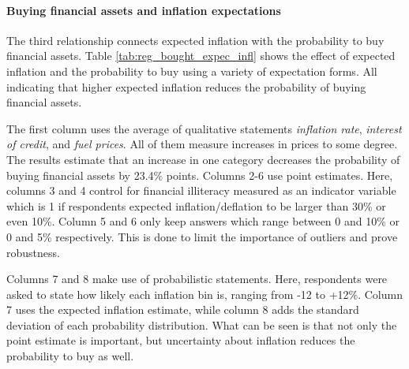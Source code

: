 \documentclass[ProjectABM]{subfiles}
\begin{document}



\paragraph{Buying financial assets and inflation expectations}
The third relationship connects expected inflation with the probability to buy financial assets. %
Table \ref{tab:reg_bought_expec_infl} shows the effect of expected inflation and the probability to buy using a variety of expectation forms. All indicating that higher expected inflation reduces the probability of buying financial assets.

The first column uses the average of qualitative statements \textit{inflation rate}, \textit{interest of credit}, and \textit{fuel prices}. All of them measure increases in prices to some degree. The results estimate that an increase in one category decreases the probability of buying financial assets by 23.4\% points. Columns 2-6 use point estimates. Here, columns 3 and 4 control for financial illiteracy measured as an indicator variable which is 1 if respondents expected inflation/deflation to be larger than 30\% or even 10\%. Column 5 and 6 only keep answers which range between 0 and 10\% or 0 and 5\% respectively. This is done to limit the importance of outliers and prove robustness.

Columns 7 and 8 make use of probabilistic statements. Here, respondents were asked to state how likely each inflation bin is, ranging from -12 to +12\%. Column 7 uses the expected inflation estimate, while column 8 adds the standard deviation of each probability distribution. What can be seen is that not only the point estimate is important, but uncertainty about inflation reduces the probability to buy as well. %
\end{document}
